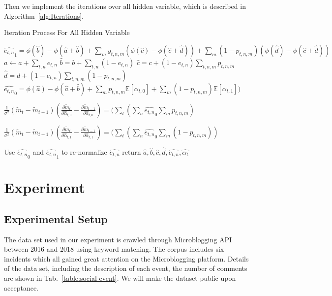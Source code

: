 \documentclass[runningheads]{llncs}
\newcommand{\Ep}{\mathbb{E}}
\begin{document}
Then we implement the iterations over all hidden variable, which is described in Algorithm~\ref{alg:Iterations}.

\begin{algorithm}\label{alg:Iterations}
\caption{Iteration Process For All Hidden Variable}
\begin{algorithmic}
\STATE $\hat{e_{t,n}}_1 = \phi(\hat{b})-\phi(\hat{a}+\hat{b}) + \sum_{m}  y_{t,n,m} (\phi(\hat{c})-\phi(\hat{c}+\hat{d})) +\sum_m (1-p_{t,n,m}) (\phi(\hat{d})-\phi(\hat{c}+\hat{d}))$\;
\STATE $a \leftarrow  a+ \sum_{t,n} e_{t,n}$\;
\STATE $\hat{b}  =  b+ \sum_{t,n} (1-e_{t,n})$\;
\STATE $\hat{c}  =  c+ (1-e_{t,n}) \sum_{t,n,m} p_{t,n,m}$\;
\STATE $\hat{d}  =  d+ (1-e_{t,n}) \sum_{t,n,m} (1-p_{t,n,m})$\;
\STATE $\hat{e_{t,n}}_0=\phi(\hat{a})-\phi(\hat{a}+\hat{b}) + \sum_{m}  p_{t,n,m}   \Ep[\alpha_{t,0}] +\sum_m (1-p_{t,n,m}) \Ep[\alpha_{t,1}])$\;

\STATE $\frac{1}{\sigma^2}(\widetilde{m}_{t}-\widetilde{m}_{t-1})(\frac{\partial \widetilde{m}_{t}}{\partial \hat{\alpha}_{t,0}}-\frac{\partial \widetilde{m}_{t-1}}{\partial \hat{\alpha}_{t,0}}) = (\sum_t(\sum_n \hat{e_{t,n}}_0 \sum_m p_{t,n,m})$

\STATE $\frac{1}{\sigma^2}(\widetilde{m}_{t}-\widetilde{m}_{t-1})(\frac{\partial \widetilde{m}_{t}}{\partial \hat{\alpha}_{t,1}}-\frac{\partial \widetilde{m}_{t-1}}{\partial \hat{\alpha}_{t,1}}) = (\sum_t(\sum_n \hat{e_{t,n}}_0 \sum_m (1-p_{t,n,m}))$

\ENDWHILE\;
Use $\hat{e_{t,n}}_0$ and $\hat{e_{t,n}}_1$ to re-normalize $\hat{e_{t,n}}$\;
return $\hat{a},\hat{b},\hat{c},\hat{d},\hat{e_{t,n}},\hat{\alpha_{t}}$
\end{algorithmic}
\end{algorithm}




\section{Experiment}\label{sec:Experiment}
\subsection{Experimental Setup}
The data set used in our experiment is crawled through Microblogging API between 2016 and 2018 using keyword matching. The corpus includes six incidents which all gained great attention on the Microblogging platform. 
Details of the data set, including the description of each event, the number of comments are shown in Tab.~\ref{table:social event}. We will make the dataset public upon acceptance.
\end{document}
